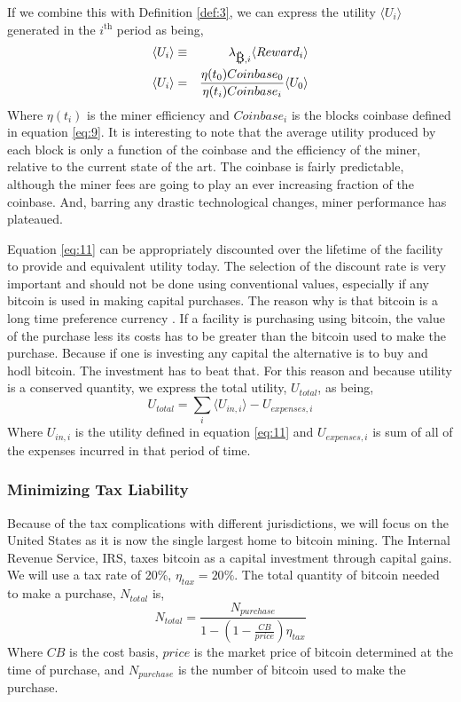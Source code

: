 \documentclass[runningheads]{llncs}
\def\bitcoin{
    \leavevmode
    \vtop{\offinterlineskip %
    \setbox0=\hbox{B}
    \setbox2=\hbox to\wd0{\hfil\hskip-.03em
    \vrule height .3ex width .15ex\hskip .08em
    \vrule height .3ex width .15ex\hfil}
    \vbox{\copy2\box0}\box2}
}
\begin{document}
If we combine this with Definition \ref{def:3}, we can express the utility $\langle U_i \rangle$ generated in the $i^{\mbox{th}}$ period as being,
\begin{eqnarray}
    \langle U_i \rangle &\equiv& \lambda_{\bitcoin, i} \langle Reward_i \rangle \\
    \langle U_i \rangle &=& \frac{\eta(t_0) Coinbase_0}{\eta(t_i)Coinbase_i} \langle U_0 \rangle \label{eq:11}
\end{eqnarray}
Where $\eta(t_i)$ is the miner efficiency and $Coinbase_i$ is the blocks coinbase defined in equation \ref{eq:9}.
It is interesting to note that the average utility produced by each block is only a function of the coinbase and the efficiency of the miner, relative to the current state of the art.
The coinbase is fairly predictable, although the miner fees are going to play an ever increasing fraction of the coinbase.
And, barring any drastic technological changes, miner performance has plateaued.

Equation \ref{eq:11} can be appropriately discounted over the lifetime of the facility to provide and equivalent utility today.
The selection of the discount rate is very important and should not be done using conventional values, especially if any bitcoin is used in making capital purchases.
The reason why is that bitcoin is a long time preference currency \cite{ammous2018bitcoin}.
If a facility is purchasing using bitcoin, the value of the purchase less its costs has to be greater than the bitcoin used to make the purchase.
Because if one is investing any capital the alternative is to buy and hodl bitcoin.
The investment has to beat that.
For this reason and because utility is a conserved quantity, we express the total utility, $U_{total}$, as being,
\begin{equation}
    U_{total} = \sum_i \langle U_{in,i} \rangle - U_{expenses,i}\label{eq:12}
\end{equation}
Where $U_{in,i}$ is the utility defined in equation \ref{eq:11} and $U_{expenses,i}$ is sum of all of the expenses incurred in that period of time.

\subsubsection{Minimizing Tax Liability}
Because of the tax complications with different jurisdictions, we will focus on the United States as it is now the single largest home to bitcoin mining.
The Internal Revenue Service, IRS, taxes bitcoin as a capital investment through capital gains.
We will use a tax rate of 20\%, $\eta_{tax} = 20\%$.
The total quantity of bitcoin needed to make a purchase, $N_{total}$ is,
\begin{equation}
    N_{total} = \frac{N_{purchase}}{1-(1-\frac{CB}{price})\eta_{tax}}
\end{equation}
Where $CB$ is the cost basis, $price$ is the market price of bitcoin determined at the time of purchase, and $N_{purchase}$ is the number of bitcoin used to make the purchase.
\end{document}
